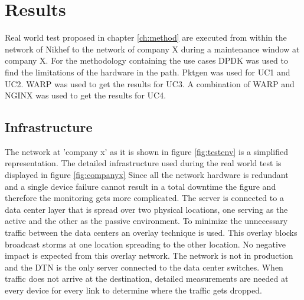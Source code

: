 \chapter{Results}\label{ch:results}

Real world test proposed in chapter \ref{ch:method} are executed from within the network of Nikhef to the network of company X during a maintenance window at company X.
For the methodology containing the use cases DPDK was used to find the limitations of the hardware in the path. 
Pktgen was used for UC1 and UC2. WARP was used to get the results for UC3.
A combination of WARP and NGINX was used to get the results for UC4. 


\section{Infrastructure}
The network at 'company x' as it is shown in figure \ref{fig:testenv} is a simplified representation.
The detailed infrastructure used during the real world test is displayed in figure \ref{fig:companyx} 
Since all the network hardware is redundant and a single device failure cannot result in a total downtime the figure and therefore the monitoring gets more complicated.
The server is connected to a data center layer that is spread over two physical locations, one serving as the active and the other as the passive environment.
To minimize the unnecessary traffic between the data centers an overlay technique is used. This overlay blocks broadcast storms at one location spreading to the other location.
No negative impact is expected from this overlay network. The network is not in production and the DTN is the only server connected to the data center switches.     
When traffic does not arrive at the destination, detailed measurements are needed at every device for every link to determine where the traffic gets dropped.   

